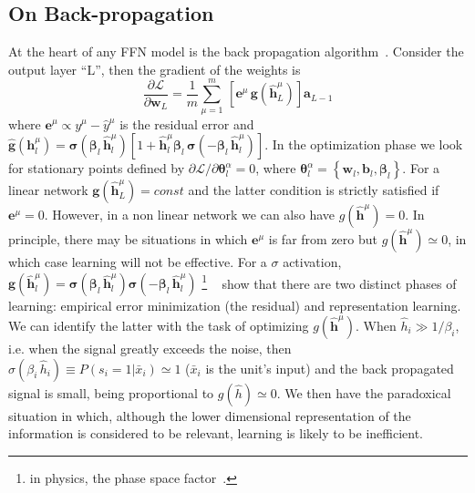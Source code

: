 \documentclass{article}
\begin{document}
\subsection{On Back-propagation} \label{sub:back}
At the heart of any FFN model is the back propagation algorithm~\cite{hertz, bishop}. Consider the output layer ``L'', then the gradient of the weights is
%
\begin{equation} \label{eq:gradsL}
\frac{\partial \mathscr{L}}{\partial \mathbf{w}_L } =  \frac{1}{m} \sum_{\mu=1}^m \, \left[ \mathbf{e}^{\mu} \, \mathbf{g}(\hat{\mathbf{h}}^{\mu} _L) \right]  \mathbf{a}_{L-1}
 \end{equation}
%
where $\mathbf{e}^{\mu}\propto y^{\mu} - \hat{y}^{\mu}$ is the residual error and $\hat{\mathbf{g}}(\mathbf{h}^{\mu}_l) =  \boldsymbol{\sigma}(\boldsymbol{\beta}_l \, \hat{\mathbf{h}}^{\mu}_l)[ 1 + \hat{\mathbf{h}}^{\mu}_l \boldsymbol{\beta}_l \, \boldsymbol{\sigma}(-\boldsymbol{\beta}_l \, \hat{\mathbf{h}}^{\mu}_l) ] $. In the optimization phase we look for stationary points defined by $\partial \mathscr{L}/\partial \boldsymbol{\theta}^{\alpha}_l=0$, where $\boldsymbol{\theta}^{\alpha}_l = \left\{ \mathbf{w}_l, \mathbf{b}_l, \boldsymbol{\beta}_l \right\} $. For a linear network $\mathbf{g}(\hat{\mathbf{h}}^{\mu} _L)=const$ and the latter condition is  strictly satisfied if $ \mathbf{e}^{\mu}=0$. However, in a non linear network we can also have $g(\hat{\mathbf{h}}^{\mu})=0$. In principle, there may be situations in which $\mathbf{e}^{\mu}$ is far from zero but $g(\hat{\mathbf{h}}^{\mu}) \simeq 0$, in which case learning will not be effective. For a $\sigma$ activation, $\mathbf{g}(\hat{\mathbf{h}}^{\mu}_l) = \boldsymbol{\sigma}(\boldsymbol{\beta}_l \, \hat{\mathbf{h}}^{\mu}_l)\boldsymbol{\sigma}(-\boldsymbol{\beta}_l \, \hat{\mathbf{h}}^{\mu}_l)$ \footnote{in physics, the phase space factor~\cite{roberto}.}%
~\cite{tishby1, tishby2} show that there are two distinct phases of learning: empirical error minimization (the residual) and representation learning. We can identify the latter with the task of optimizing $g(\hat{\mathbf{h}}^{\mu})$. When $\hat{h}_i \gg 1/\beta_i$, i.e. when the signal greatly exceeds the noise, then $\sigma( \beta_i \,\hat{ h}_i) \equiv P(s_i=1| \bar{x}_i)  \simeq 1$ ($\bar{x}_i$ is the unit's input) and the back propagated signal is small, being proportional to $g(\hat{h} ) \simeq 0$. We then have the paradoxical situation in which, although the lower dimensional representation of the information is considered to be relevant, learning is likely to be inefficient.
\end{document}
